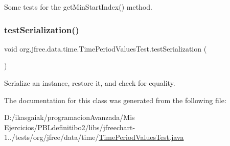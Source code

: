 Some tests for the get\+Min\+Start\+Index() method. \mbox{\label{classorg_1_1jfree_1_1data_1_1time_1_1_time_period_values_test_aec4bbc4ed15c4c6e9972c25fa5e04365}} 
\subsubsection{\texorpdfstring{test\+Serialization()}{testSerialization()}}
{\footnotesize\ttfamily void org.\+jfree.\+data.\+time.\+Time\+Period\+Values\+Test.\+test\+Serialization (\begin{DoxyParamCaption}{ }\end{DoxyParamCaption})}

Serialize an instance, restore it, and check for equality. 

The documentation for this class was generated from the following file\+:\begin{DoxyCompactItemize}
\item 
D\+:/ikasgaiak/programacion\+Avanzada/\+Mis Ejercicios/\+P\+B\+Ldefinitibo2/libs/jfreechart-\/1../tests/org/jfree/data/time/\mbox{\hyperlink{_time_period_values_test_8java}{Time\+Period\+Values\+Test.\+java}}\end{DoxyCompactItemize}
